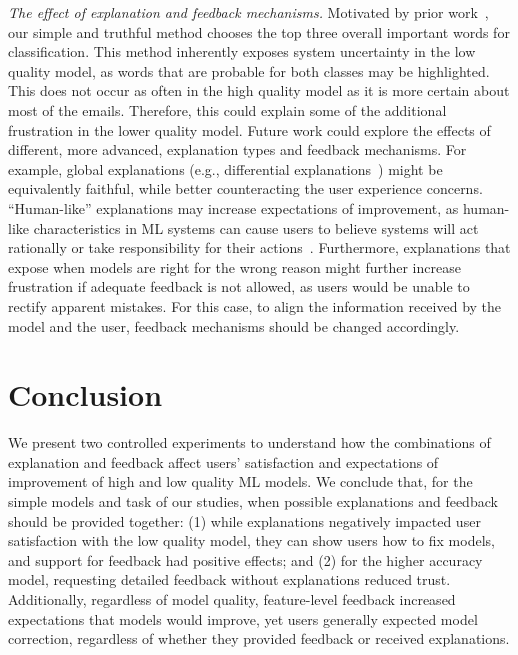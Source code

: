 \emph{The effect of explanation and feedback mechanisms.}
Motivated by prior work~\cite{Narayanan2018HowExplanation, Kulesza2013TooModels}, our simple and truthful method chooses the top three overall important words for classification. 
This method inherently exposes system uncertainty in the low quality model, as words that are probable for both classes may be highlighted. This does not occur as often in the high quality model as it is more certain about most of the emails. Therefore, this could explain some of the additional frustration in the lower quality model.
Future work could explore the effects of different, more advanced, explanation types and feedback mechanisms.
For example, global explanations (e.g., differential explanations~\cite{Lakkaraju2019FaithfulModels}) might be equivalently faithful, while better counteracting the user experience concerns.
``Human-like'' explanations may increase expectations of improvement, as human-like characteristics in ML systems can cause users to believe systems will act rationally or take responsibility for their actions~\cite{Hook2000StepsReal}. 
Furthermore, explanations that expose when models are right for the wrong reason might further increase frustration if adequate feedback is not allowed, as users would be unable to rectify apparent mistakes.
For this case, to align the information received by the model and the user, feedback mechanisms should be changed accordingly.

\section{Conclusion}

We present two controlled experiments to understand how the combinations of explanation and feedback affect users' satisfaction and expectations of improvement of high and low quality ML models. We conclude that, for the simple models and task of our studies, when possible explanations and feedback should be provided together: (1) while explanations negatively impacted user satisfaction with the low quality model, they can show users how to fix models, and support for feedback had positive effects; and (2) for the higher accuracy model, requesting detailed feedback without explanations reduced trust.
Additionally, regardless of model quality, feature-level feedback increased expectations that models would improve, yet users generally expected model correction, regardless of whether they provided feedback or received explanations.  
